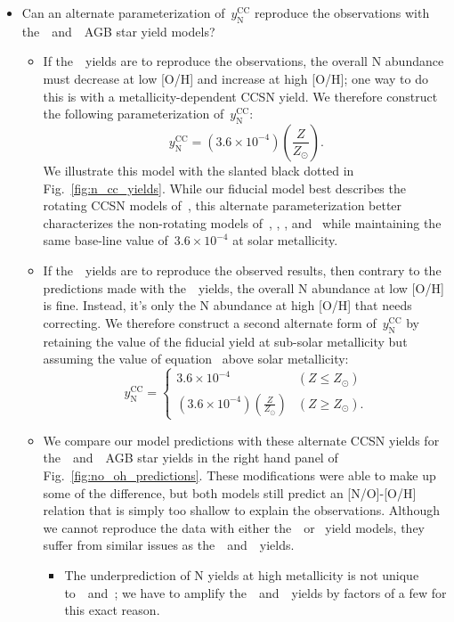\documentclass[ms.tex]{subfiles}
\begin{document}
\begin{itemize}
	\item Can an alternate parameterization of~$y_\text{N}^\text{CC}$ reproduce 
	the observations with the~\karakasten~and~\karakas~AGB star yield models? 
	\begin{itemize} 
		\item If the~\karakasten~yields are to reproduce the observations, the 
		overall N abundance must decrease at low [O/H] and increase at high 
		[O/H]; one way to do this is with a metallicity-dependent CCSN yield. 
		We therefore construct the following parameterization 
		of~$y_\text{N}^\text{CC}$: 
		\begin{equation} 
		y_\text{N}^\text{CC} = (3.6\times10^{-4})\left(\frac{Z}{Z_\odot}\right). 
		\label{eq:linear_yncc} 
		\end{equation} 
		We illustrate this model with the slanted black dotted in 
		Fig.~\ref{fig:n_cc_yields}. 
		While our fiducial model best describes the rotating CCSN models 
		of~\citet{Limongi2018}, this alternate parameterization better 
		characterizes the non-rotating models of~\citet{Limongi2018}, 
		\citet{Sukhbold2016}, \citet{Nomoto2013}, and~\citet{Woosley1995} while 
		maintaining the same base-line value of~$3.6\times10^{-4}$ at solar 
		metallicity. 

		\item If the~\karakas~yields are to reproduce the observed results, 
		then contrary to the predictions made with the~\karakasten~yields, the 
		overall N abundance at low [O/H] is fine. 
		Instead, it's only the N abundance at high [O/H] that needs 
		correcting. 
		We therefore construct a second alternate form of~$y_\text{N}^\text{CC}$ 
		by retaining the value of the fiducial yield at sub-solar metallicity 
		but assuming the value of equation~ above solar 
		metallicity: 
		\begin{equation} 
		y_\text{N}^\text{CC} = \begin{cases} 
		3.6\times10^{-4} & (Z \leq Z_\odot) 
		\\ 
		(3.6\times10^{-4})\left(\frac{Z}{Z_\odot}\right) & (Z \geq Z_\odot). 
		\end{cases} 
		\label{eq:broken_yncc} 
		\end{equation} 

		\item We compare our model predictions with these alternate CCSN yields 
		for the~\karakasten~and~\karakas~AGB star yields in the right hand 
		panel of Fig.~\ref{fig:no_oh_predictions}. 
		These modifications were able to make up some of the difference, but 
		both models still predict an [N/O]-[O/H] relation that is simply too 
		shallow to explain the observations. 
		Although we cannot reproduce the data with either the~\karakasten~or 
		\karakas~yield models, they suffer from similar issues as 
		the~\cristallo~and~\ventura~yields. 
		\begin{itemize} 
			\item The underprediction of N yields at high metallicity is not 
			unique to~\karakasten~and~\karakas; we have to amplify 
			the~\cristallo~and~\ventura~yields by factors of a few for this 
			exact reason. 


\end{itemize}
\end{itemize}
\end{itemize}
\end{document}
